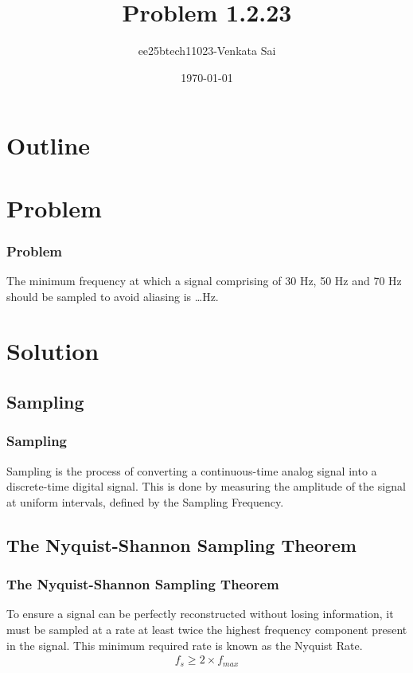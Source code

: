 \documentclass{beamer}
\title{Problem 1.2.23}
\author{ee25btech11023-Venkata Sai}
\date{\today}
\theoremstyle{remark}
\numberwithin{equation}{section}
\begin{document}
\begin{frame}
\titlepage
\end{frame}

\section*{Outline}
\begin{frame}
\tableofcontents
\end{frame}

\section{Problem}

\begin{frame}
\frametitle{Problem}
The minimum frequency at which a signal comprising of 30 Hz, 50 Hz and 70 Hz should be sampled to avoid aliasing is \dots Hz.
\end{frame}
\section{Solution}

\subsection{Sampling}
\setcounter{section}{1}
\begin{frame}
\frametitle{Sampling}
 Sampling is the process of converting a continuous-time analog signal into a discrete-time digital signal. This is done by measuring the amplitude of the signal at uniform intervals, defined by the Sampling Frequency.
\end{frame}
\subsection{The Nyquist-Shannon Sampling Theorem}
\begin{frame}
\frametitle{The Nyquist-Shannon Sampling Theorem}
To ensure a signal can be perfectly reconstructed without losing information, it must be sampled at a rate at least twice the highest frequency component present in the signal. This minimum required rate is known as the Nyquist Rate.
\begin{align}
f_s\geq 2 \times f_{max}
  \end{align}
\end{frame}
\end{document}
